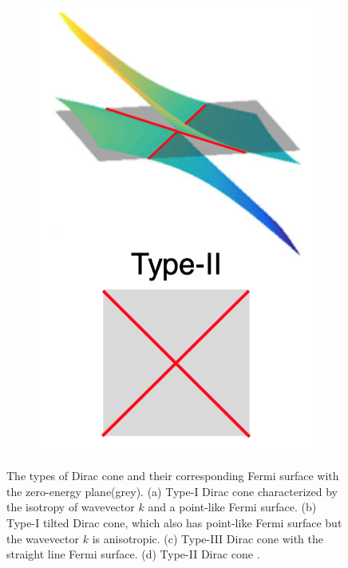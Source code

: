 \begin{figure}[H]
\begin{subfigure}[b]{0.2\linewidth}
            \includegraphics[width = \linewidth]{fig/Chap 2/Type II.png}
            \caption{}
            \label{2fig:type2}
        \end{subfigure}
    \caption{The types of Dirac cone and their corresponding Fermi surface with the zero-energy plane(grey). 
                (a) Type-I Dirac cone characterized by the isotropy of wavevector $k$ and a point-like Fermi surface.
                (b) Type-I tilted Dirac cone, which also has point-like Fermi surface but the wavevector $k$ is anisotropic.
                (c) Type-III Dirac cone with the straight line Fermi surface.
                (d) Type-II Dirac cone \cite{Milicevic2019}.}
    \label{2fig:Dirac cone type}
    \end{figure}
